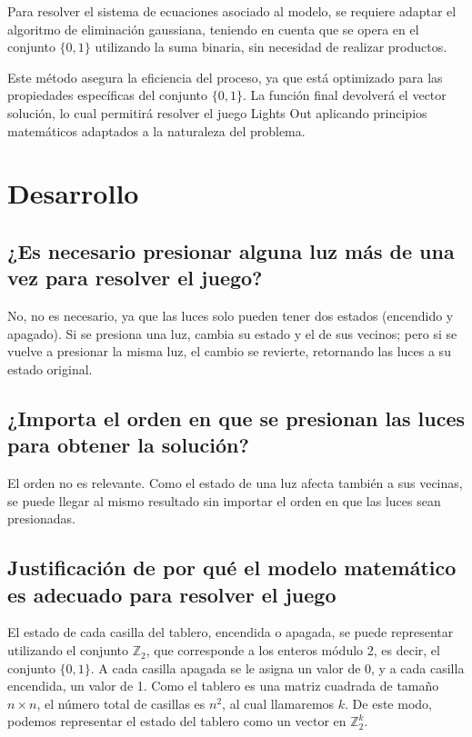 \documentclass{article}
\begin{document}
    Para resolver el sistema de ecuaciones asociado al modelo, se requiere adaptar el algoritmo de eliminación gaussiana, teniendo en cuenta que se opera en el conjunto \(\{0, 1\}\) utilizando la suma binaria, sin necesidad de realizar productos.
    
    Este método asegura la eficiencia del proceso, ya que está optimizado para las propiedades específicas del conjunto \(\{0, 1\}\). La función final devolverá el vector solución, lo cual permitirá resolver el juego Lights Out aplicando principios matemáticos adaptados a la naturaleza del problema.

    \newpage

    \section{Desarrollo}
    
    \subsection{¿Es necesario presionar alguna luz más de una vez para resolver el juego?}
    No, no es necesario, ya que las luces solo pueden tener dos estados (encendido y apagado). Si se presiona una luz, cambia su estado y el de sus vecinos; pero si se vuelve a presionar la misma luz, el cambio se revierte, retornando las luces a su estado original.
    
    \subsection{¿Importa el orden en que se presionan las luces para obtener la solución?}
    
    El orden no es relevante. Como el estado de una luz afecta también a sus vecinas, se puede llegar al mismo resultado sin importar el orden en que las luces sean presionadas.

    \subsection{Justificación de por qué el modelo matemático es adecuado para resolver el juego}

    El estado de cada casilla del tablero, encendida o apagada, se puede representar utilizando el conjunto $\mathbb{Z}_2$, que corresponde a los enteros módulo 2, es decir, el conjunto $\{0, 1\}$. A cada casilla apagada se le asigna un valor de 0, y a cada casilla encendida, un valor de 1. Como el tablero es una matriz cuadrada de tamaño $n \times n$, el número total de casillas es $n^2$, al cual llamaremos $k$. De este modo, podemos representar el estado del tablero como un vector en $\mathbb{Z}^k_2$.
        
\end{document}
